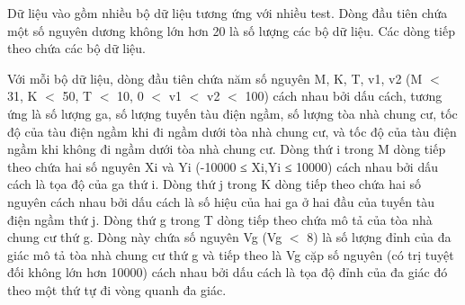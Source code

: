 Dữ liệu vào gồm nhiều bộ dữ liệu tương ứng với nhiều test. Dòng đầu tiên chứa một số nguyên dương không lớn hơn 20 là số lượng các bộ dữ liệu. Các dòng tiếp theo chứa các bộ dữ liệu.  

   Với mỗi bộ dữ liệu, dòng đầu tiên chứa năm số nguyên M, K, T, v1, v2 (M $<$ 31, K $<$ 50, T $<$ 10, 0 $<$ v1 $<$ v2 $<$ 100) cách nhau bởi dấu cách, tương ứng là số lượng ga, số lượng tuyến tàu điện ngầm, số lượng tòa nhà chung cư, tốc độ của tàu điện ngầm khi đi ngầm dưới tòa nhà chung cư, và tốc độ của tàu điện ngầm khi không đi ngầm dưới tòa nhà chung cư. Dòng thứ i trong M dòng tiếp theo chứa hai số nguyên Xi và Yi (-10000 ≤ Xi,Yi ≤ 10000) cách nhau bởi dấu cách là tọa độ của ga thứ i. Dòng thứ j trong K dòng tiếp theo chứa hai số nguyên cách nhau bởi dấu cách là số hiệu của hai ga ở hai đầu của tuyến tàu điện ngầm thứ j. Dòng thứ g trong T dòng tiếp theo chứa mô tả của tòa nhà chung cư thứ g. Dòng này chứa số nguyên Vg (Vg $<$ 8) là số lượng đỉnh của đa giác mô tả tòa nhà chung cư thứ g và tiếp theo là Vg cặp số nguyên (có trị tuyệt đối không lớn hơn 10000) cách nhau bởi dấu cách là tọa độ đỉnh của đa giác đó theo một thứ tự đi vòng quanh đa giác.  

\